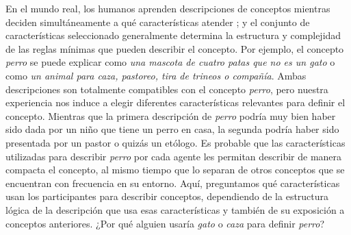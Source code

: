 En el mundo real, los humanos aprenden descripciones de conceptos mientras deciden simultáneamente a qué características atender \cite{schyns1998development}; y el conjunto de características seleccionado generalmente determina la estructura y complejidad de las reglas mínimas que pueden describir el concepto. Por ejemplo, el concepto \textit{perro} se puede explicar como {\em una mascota de cuatro patas que no es un gato} o como {\em un animal para caza, pastoreo, tira de trineos o compañía}. Ambas descripciones son totalmente compatibles con el concepto \textit{perro}, pero nuestra experiencia nos induce a elegir diferentes características relevantes para definir el concepto. Mientras que la primera descripción de {\em perro} podría muy bien haber sido dada por un niño que tiene un perro en casa, la segunda podría haber sido presentada por un pastor o quizás un etólogo. Es probable que las características utilizadas para describir {\em perro} por cada agente les permitan describir de manera compacta el concepto, al mismo tiempo que lo separan de otros conceptos que se encuentran con frecuencia en su entorno. Aquí, preguntamos qué características usan los participantes para describir conceptos, dependiendo de la estructura lógica de la descripción que usa esas características y también de su exposición a conceptos anteriores. ¿Por qué alguien usaría {\em gato} o {\em caza} para definir {\em perro}?
